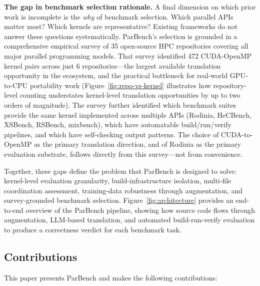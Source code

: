 \documentclass[conference]{IEEEtran}
\begin{document}
\textbf{The gap in benchmark selection rationale.} A final dimension on which prior work is incomplete is the \emph{why} of benchmark selection. Which parallel APIs matter most? Which kernels are representative? Existing frameworks do not answer these questions systematically. ParBench's selection is grounded in a comprehensive empirical survey of 35 open-source HPC repositories covering all major parallel programming models. That survey identified 472 CUDA-OpenMP kernel pairs across just 6 repositories---the largest available translation opportunity in the ecosystem, and the practical bottleneck for real-world GPU-to-CPU portability work (Figure~\ref{fig:repo-vs-kernel} illustrates how repository-level counting understates kernel-level translation opportunities by up to two orders of magnitude). The survey further identified which benchmark suites provide the same kernel implemented across multiple APIs (Rodinia, HeCBench, XSBench, RSBench, mixbench), which have automatable build/run/verify pipelines, and which have self-checking output patterns. The choice of CUDA-to-OpenMP as the primary translation direction, and of Rodinia as the primary evaluation substrate, follows directly from this survey---not from convenience.

Together, these gaps define the problem that ParBench is designed to solve: kernel-level evaluation granularity, build-infrastructure isolation, multi-file coordination assessment, training-data robustness through augmentation, and survey-grounded benchmark selection. Figure~\ref{fig:architecture} provides an end-to-end overview of the ParBench pipeline, showing how source code flows through augmentation, LLM-based translation, and automated build-run-verify evaluation to produce a correctness verdict for each benchmark task.

\subsection{Contributions}
\label{sec:contributions}

This paper presents ParBench and makes the following contributions:
\end{document}
